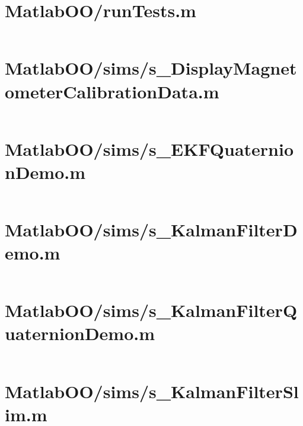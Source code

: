 \pagebreak
\section*{MatlabOO/runTests.m}\label{code:MatlabOO/runTests.m}
\inputminted[linenos,fontsize=\scriptsize]{matlab}{/home/dcouture/git/mathyourlife/TSatPy/beta_versions/matlab_object_oriented/runTests.m}

\pagebreak
\section*{MatlabOO/sims/s\_DisplayMagnetometerCalibrationData.m}\label{code:MatlabOO/sims/s_DisplayMagnetometerCalibrationData.m}
\inputminted[linenos,fontsize=\scriptsize]{matlab}{/home/dcouture/git/mathyourlife/TSatPy/beta_versions/matlab_object_oriented/sims/s_DisplayMagnetometerCalibrationData.m}

\pagebreak
\section*{MatlabOO/sims/s\_EKFQuaternionDemo.m}\label{code:MatlabOO/sims/s_EKFQuaternionDemo.m}
\inputminted[linenos,fontsize=\scriptsize]{matlab}{/home/dcouture/git/mathyourlife/TSatPy/beta_versions/matlab_object_oriented/sims/s_EKFQuaternionDemo.m}

\pagebreak
\section*{MatlabOO/sims/s\_KalmanFilterDemo.m}\label{code:MatlabOO/sims/s_KalmanFilterDemo.m}
\inputminted[linenos,fontsize=\scriptsize]{matlab}{/home/dcouture/git/mathyourlife/TSatPy/beta_versions/matlab_object_oriented/sims/s_KalmanFilterDemo.m}

\pagebreak
\section*{MatlabOO/sims/s\_KalmanFilterQuaternionDemo.m}\label{code:MatlabOO/sims/s_KalmanFilterQuaternionDemo.m}
\inputminted[linenos,fontsize=\scriptsize]{matlab}{/home/dcouture/git/mathyourlife/TSatPy/beta_versions/matlab_object_oriented/sims/s_KalmanFilterQuaternionDemo.m}

\pagebreak
\section*{MatlabOO/sims/s\_KalmanFilterSlim.m}\label{code:MatlabOO/sims/s_KalmanFilterSlim.m}
\inputminted[linenos,fontsize=\scriptsize]{matlab}{/home/dcouture/git/mathyourlife/TSatPy/beta_versions/matlab_object_oriented/sims/s_KalmanFilterSlim.m}

